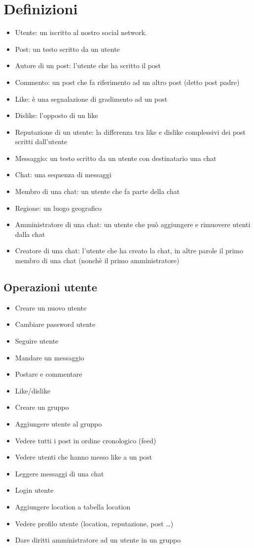 \documentclass[a4paper,12pt]{report}
\begin{document}
\section{Definizioni}
\begin{itemize}
    \item Utente: un iscritto al nostro social network.  
    \item Post: un testo scritto da un utente 
    \item Autore di un post: l'utente che ha scritto il post
    \item Commento: un post che fa riferimento ad un altro post (detto post padre)
    \item Like: è una segnalazione di gradimento ad un post
    \item Dislike: l'opposto di un like
    \item Reputazione di un utente: la differenza tra like e dislike complessivi dei post scritti dall'utente
    \item Messaggio: un testo scritto da un utente con destinatario una chat 
    \item Chat: una sequenza di messaggi
    \item Membro di una chat: un utente che fa parte della chat  
    \item Regione: un luogo geografico
    \item Amministratore di una chat: un utente che può aggiungere e rimuovere utenti dalla chat
    \item Creatore di una chat: l'utente che ha creato la chat, in altre parole il primo membro di una chat (nonchè il primo amministratore)
\end{itemize}


\subsection{Operazioni utente}
\begin{itemize}
    \item Creare un nuovo utente
    \item Cambiare password utente
    \item Seguire utente
    \item Mandare un messaggio
    \item Postare e commentare
    \item Like/dislike
    \item Creare un gruppo
    \item Aggiungere utente al gruppo
    \item Vedere tutti i post in ordine cronologico (feed)
    \item Vedere utenti che hanno messo like a un post
    \item Leggere messaggi di una chat
    \item Login utente
    \item Aggiungere location a tabella location
    \item Vedere profilo utente (location, reputazione, post \ldots)
    \item Dare diritti amministratore ad un utente in un gruppo
\end{itemize}
\end{document}

